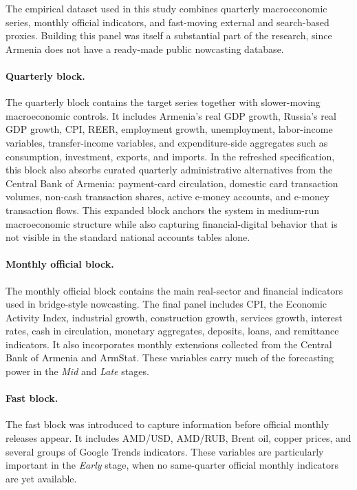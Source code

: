 \documentclass[12pt,a4paper]{report}
\begin{document}
The empirical dataset used in this study combines quarterly macroeconomic series, monthly official indicators, and fast-moving external and search-based proxies. Building this panel was itself a substantial part of the research, since Armenia does not have a ready-made public nowcasting database.

\paragraph{Quarterly block.}
The quarterly block contains the target series together with slower-moving macroeconomic controls. It includes Armenia's real GDP growth, Russia's real GDP growth, CPI, REER, employment growth, unemployment, labor-income variables, transfer-income variables, and expenditure-side aggregates such as consumption, investment, exports, and imports. In the refreshed specification, this block also absorbs curated quarterly administrative alternatives from the Central Bank of Armenia: payment-card circulation, domestic card transaction volumes, non-cash transaction shares, active e-money accounts, and e-money transaction flows. This expanded block anchors the system in medium-run macroeconomic structure while also capturing financial-digital behavior that is not visible in the standard national accounts tables alone.

\paragraph{Monthly official block.}
The monthly official block contains the main real-sector and financial indicators used in bridge-style nowcasting. The final panel includes CPI, the Economic Activity Index, industrial growth, construction growth, services growth, interest rates, cash in circulation, monetary aggregates, deposits, loans, and remittance indicators. It also incorporates monthly extensions collected from the Central Bank of Armenia and ArmStat. These variables carry much of the forecasting power in the \textit{Mid} and \textit{Late} stages.

\paragraph{Fast block.}
The fast block was introduced to capture information before official monthly releases appear. It includes AMD/USD, AMD/RUB, Brent oil, copper prices, and several groups of Google Trends indicators. These variables are particularly important in the \textit{Early} stage, when no same-quarter official monthly indicators are yet available.
\end{document}
